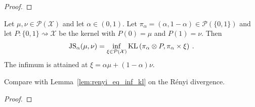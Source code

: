 \begin{proof}%
\uses{}

\end{proof}


\begin{lemma}
  \label{lem:jensenShannon_eq_inf_kl}
  Let $\mu, \nu \in \mathcal P(\mathcal X)$ and let $\alpha \in (0, 1)$. Let $\pi_\alpha = (\alpha, 1 - \alpha) \in \mathcal P(\{0,1\})$ and let $P : \{0,1\} \rightsquigarrow \mathcal X$ be the kernel with $P(0) = \mu$ and $P(1) = \nu$. Then
  \begin{align*}
  \operatorname{JS}_\alpha(\mu, \nu) = \inf_{\xi \in \mathcal P(\mathcal X)} \operatorname{KL}\left( \pi_\alpha \otimes P, \pi_\alpha \times \xi \right) \: .
  \end{align*}
  The infimum is attained at $\xi = \alpha \mu + (1 - \alpha) \nu$.
\end{lemma}

Compare with Lemma~\ref{lem:renyi_eq_inf_kl} on the Rényi divergence.

\begin{proof}%
\uses{}

\end{proof}
